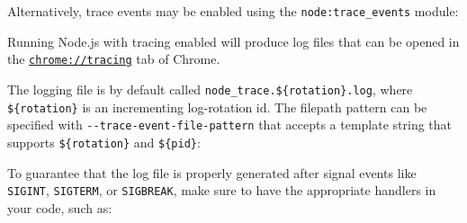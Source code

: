 Alternatively, trace events may be enabled using the
\texttt{node:trace\_events} module:

\begin{Shaded}
\begin{Highlighting}[]
\OperatorTok{=} \NormalTok{(}\NormalTok{)}\OperatorTok{;}
\OperatorTok{=}\NormalTok{(\{ }\OperatorTok{:}\NormalTok{ [}\NormalTok{] \})}\OperatorTok{;}
\NormalTok{()}\OperatorTok{;}  


\NormalTok{()}\OperatorTok{;}  
\end{Highlighting}
\end{Shaded}

Running Node.js with tracing enabled will produce log files that can be
opened in the
\href{https://www.chromium.org/developers/how-tos/trace-event-profiling-tool}{\texttt{chrome://tracing}}
tab of Chrome.

The logging file is by default called
\texttt{node\_trace.\$\{rotation\}.log}, where \texttt{\$\{rotation\}}
is an incrementing log-rotation id. The filepath pattern can be
specified with \texttt{-\/-trace-event-file-pattern} that accepts a
template string that supports \texttt{\$\{rotation\}} and
\texttt{\$\{pid\}}:

\begin{Shaded}
\begin{Highlighting}[]
  
\end{Highlighting}
\end{Shaded}

To guarantee that the log file is properly generated after signal events
like \texttt{SIGINT}, \texttt{SIGTERM}, or \texttt{SIGBREAK}, make sure
to have the appropriate handlers in your code, such as:


